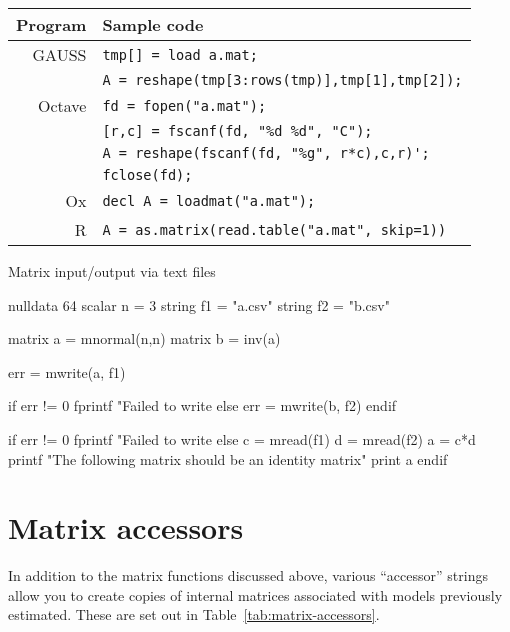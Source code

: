\begin{center}
  \begin{tabular}{rl}
    \textbf{Program} & \textbf{Sample code} \\
    \hline
    GAUSS  & \verb|tmp[] = load a.mat;| \\
    & \verb|A = reshape(tmp[3:rows(tmp)],tmp[1],tmp[2]);| \\
    Octave & \verb|fd = fopen("a.mat");| \\
    & \verb|[r,c] = fscanf(fd, "%d %d", "C");| \\
    & \verb|A = reshape(fscanf(fd, "%g", r*c),c,r)';| \\
    & \verb|fclose(fd);| \\
    Ox     & \verb|decl A = loadmat("a.mat");| \\
    R      & \verb|A = as.matrix(read.table("a.mat", skip=1))| \\
  \hline
\end{tabular}
\end{center}


\begin{script}[htbp]
  \caption{Matrix input/output via text files}
  \label{matrix-rw}
  \begin{scode}
nulldata 64
scalar n = 3
string f1 = "a.csv"
string f2 = "b.csv"

matrix a = mnormal(n,n)
matrix b = inv(a)

err = mwrite(a, f1)

if err != 0
  fprintf "Failed to write %
else
  err = mwrite(b, f2)
endif 

if err != 0
  fprintf "Failed to write %
else
  c = mread(f1)
  d = mread(f2)
  a = c*d
  printf "The following matrix should be an identity matrix\n"
  print a
endif
  \end{scode}
\end{script}

\section{Matrix accessors}
\label{matrix-accessors}

In addition to the matrix functions discussed above,
various ``accessor'' strings allow you to create copies of internal
matrices associated with models previously estimated.
These are set out in Table~\ref{tab:matrix-accessors}.

